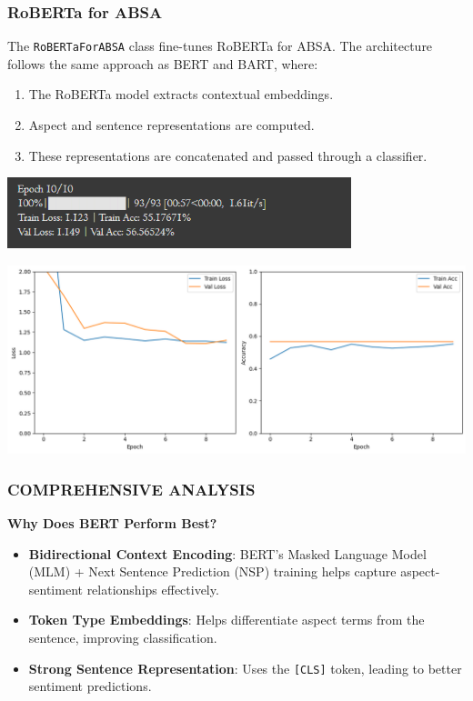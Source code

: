\documentclass{article}
\begin{document}
\subsubsection{RoBERTa for ABSA}
The \texttt{RoBERTaForABSA} class fine-tunes RoBERTa for ABSA. The architecture follows the same approach as BERT and BART, where:
\begin{enumerate}
    \item The RoBERTa model extracts contextual embeddings.
    \item Aspect and sentence representations are computed.
    \item These representations are concatenated and passed through a classifier.
\end{enumerate}

\begin{center}
\includegraphics[width=0.75\textwidth]{Roberta_Accuracy.png}
\end{center}
\begin{center}
\includegraphics[width=1\textwidth]{Roberta.png}
\end{center}

\subsubsection{COMPREHENSIVE ANALYSIS}
\textbf{Why Does BERT Perform Best?}
\begin{itemize}
    \item \textbf{Bidirectional Context Encoding}: BERT’s Masked Language Model (MLM) + Next Sentence Prediction (NSP) training helps capture aspect-sentiment relationships effectively.
    \item \textbf{Token Type Embeddings}: Helps differentiate aspect terms from the sentence, improving classification.
    \item \textbf{Strong Sentence Representation}: Uses the \texttt{[CLS]} token, leading to better sentiment predictions.
\end{itemize}
\end{document}
